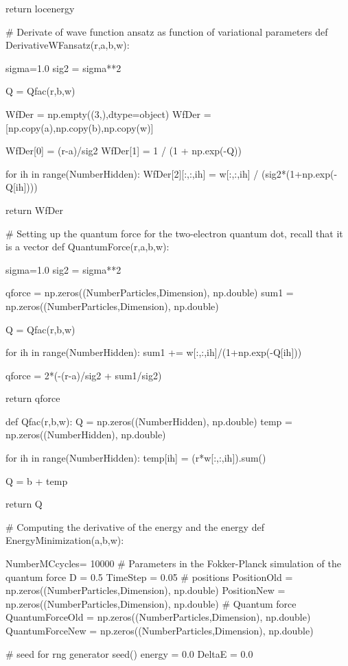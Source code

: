 \documentclass[%
oneside,                 %
final,                   %
10pt]{article}
\begin{document}
    return locenergy

# Derivate of wave function ansatz as function of variational parameters
def DerivativeWFansatz(r,a,b,w):
    
    sigma=1.0
    sig2 = sigma**2
    
    Q = Qfac(r,b,w)
    
    WfDer = np.empty((3,),dtype=object)
    WfDer = [np.copy(a),np.copy(b),np.copy(w)]
    
    WfDer[0] = (r-a)/sig2
    WfDer[1] = 1 / (1 + np.exp(-Q))
    
    for ih in range(NumberHidden):
        WfDer[2][:,:,ih] = w[:,:,ih] / (sig2*(1+np.exp(-Q[ih])))
            
    return  WfDer

# Setting up the quantum force for the two-electron quantum dot, recall that it is a vector
def QuantumForce(r,a,b,w):

    sigma=1.0
    sig2 = sigma**2
    
    qforce = np.zeros((NumberParticles,Dimension), np.double)
    sum1 = np.zeros((NumberParticles,Dimension), np.double)
    
    Q = Qfac(r,b,w)
    
    for ih in range(NumberHidden):
        sum1 += w[:,:,ih]/(1+np.exp(-Q[ih]))
    
    qforce = 2*(-(r-a)/sig2 + sum1/sig2)
    
    return qforce
    
def Qfac(r,b,w):
    Q = np.zeros((NumberHidden), np.double)
    temp = np.zeros((NumberHidden), np.double)
    
    for ih in range(NumberHidden):
        temp[ih] = (r*w[:,:,ih]).sum()
        
    Q = b + temp
    
    return Q
    
# Computing the derivative of the energy and the energy 
def EnergyMinimization(a,b,w):

    NumberMCcycles= 10000
    # Parameters in the Fokker-Planck simulation of the quantum force
    D = 0.5
    TimeStep = 0.05
    # positions
    PositionOld = np.zeros((NumberParticles,Dimension), np.double)
    PositionNew = np.zeros((NumberParticles,Dimension), np.double)
    # Quantum force
    QuantumForceOld = np.zeros((NumberParticles,Dimension), np.double)
    QuantumForceNew = np.zeros((NumberParticles,Dimension), np.double)

    # seed for rng generator 
    seed()
    energy = 0.0
    DeltaE = 0.0
\end{document}
